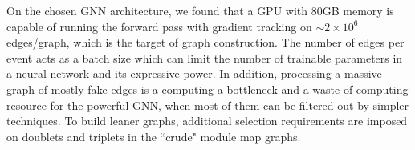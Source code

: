 On the chosen GNN architecture, we found that a GPU with 80GB memory is capable of running the forward pass with gradient tracking on $\sim 2\times 10^6$ edges/graph, which is the target of graph construction. 
The number of edges per event acts as a batch size which can limit the number of trainable parameters in a neural network and its expressive power.
In addition, processing a massive graph of mostly fake edges is a computing a bottleneck and a waste of computing resource for the powerful GNN, when most of them can be filtered out by simpler techniques. 
To build leaner graphs, additional selection requirements are imposed on doublets and triplets in the ``crude" module map graphs.

